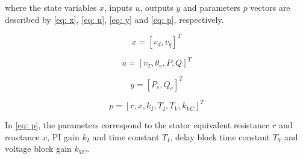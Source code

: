 \noindent where the state variables $x$, inputs $u$, outputs $y$ and parameters $p$ vectors are described by \eqref{eq: x}, \eqref{eq: u}, \eqref{eq: y} and \eqref{eq: p}, respectively.

\begin{equation}
	x = [v_{d}, v_{q}]^T
	\label{eq: x}
\end{equation}

\begin{equation}
	u = [v_{T}, \theta_{v}, P, Q]^T
	\label{eq: u}
\end{equation}

\begin{equation}
	y = [P_{e}, Q_{e}]^T
	\label{eq: y}
\end{equation}

\begin{equation}
	p = [r, x, k_{I}, T_{I}, T_{V}, k_{VC}]^T
	\label{eq: p}
\end{equation}

In \eqref{eq: p}, the parameters correspond to the stator equivalent resistance $r$ and reactance $x$, PI gain $k_{I}$ and time constant $T_{I}$, delay block time constant $T_{V}$ and voltage block gain $k_{VC}$.